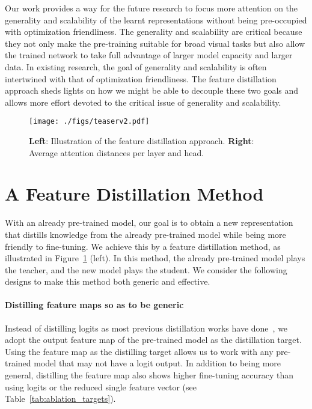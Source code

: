 \documentclass{article}
\begin{document}
Our work provides a way for the future research to focus more attention on the generality and scalability of the learnt representations without being pre-occupied with optimization friendliness. The generality and scalability are critical because they not only make the pre-training suitable for broad visual tasks but also allow the trained network to take full advantage of larger model capacity and larger data. In existing research, the goal of generality and scalability is often intertwined with that of optimization friendliness. The feature distillation approach sheds lights on how we might be able to decouple these two goals and allows more effort devoted to the critical issue of generality and scalability.

\begin{figure}
    \centering
    \texttt{[image: ./figs/teaserv2.pdf]}
    \caption{\textbf{Left}: Illustration of the feature distillation approach. \textbf{Right}: Average attention distances per layer and head.}
    \label{fig:teaser}
\end{figure}

\section{A Feature Distillation Method}

\label{sec:FD}

With an already pre-trained model, our goal is to obtain a new representation that distills knowledge from the already pre-trained model while being more friendly to fine-tuning. We achieve this by a feature distillation method, as illustrated in Figure~\ref{fig:teaser} (left). In this method, the already pre-trained model plays the teacher, and the new model plays the student. We consider the following designs to make this method both generic and effective.

\paragraph{Distilling feature maps so as to be generic} Instead of distilling logits as most previous distillation works have done~\cite{hinton2015knowledge}, we adopt the output feature map of the pre-trained model as the distillation target. Using the feature map as the distilling target allows us to work with any pre-trained model that may not have a logit output. In addition to being more general, distilling the feature map also shows higher fine-tuning accuracy than using logits or the reduced single feature vector (see Table~\ref{tab:ablation_targets}).
\end{document}
